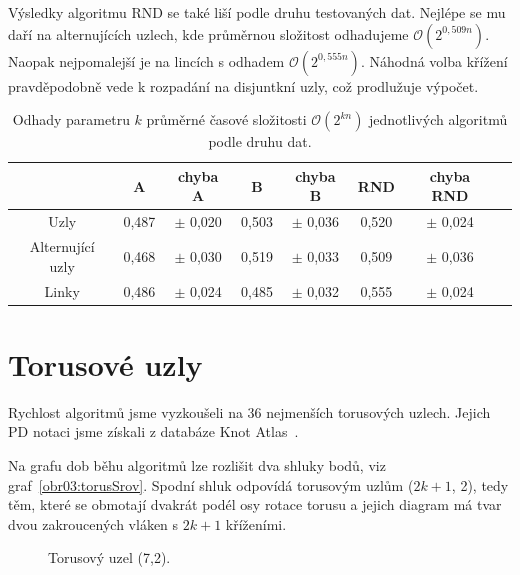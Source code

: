 Výsledky algoritmu RND se také liší podle druhu testovaných dat. Nejlépe se mu daří na alternujících uzlech, kde průměrnou složitost odhadujeme $\mathcal{O}(2^{0,509 n})$. Naopak nejpomalejší je na lincích s odhadem $\mathcal{O}(2^{0,555 n})$. Náhodná volba křížení pravděpodobně vede k rozpadání na disjuntkní uzly, což prodlužuje výpočet.

\begin{table}[t]
\centering
  \begin{tabular}{*{8}{c}}
    \toprule
       & A & chyba A & B & chyba B &  RND & chyba RND \\ 
    \midrule
    Uzly  & 0,487 & $\pm$ 0,020  &   0,503 & $\pm$ 0,036   &  0,520 & $\pm$ 0,024\\
    Alternující uzly & 0,468  & $\pm$ 0,030 &  0,519 & $\pm$  0,033 & 0,509 & $\pm$ 0,036\\
    Linky  & 0,486 &  $\pm$ 0,024 &   0,485 & $\pm$  0,032  &   0,555 & $\pm$ 0,024\\
    \bottomrule
  \end{tabular}
    \caption{Odhady parametru $k$ průměrné časové složitosti $\mathcal{O}(2^{kn})$ jednotlivých algoritmů podle druhu dat.} \label{datatab}

\end{table} 


\section{Torusové uzly} \label{torus}



Rychlost algoritmů jsme vyzkoušeli na 36 nejmenších torusových uzlech. Jejich PD notaci jsme získali z databáze Knot Atlas~\cite{knotatlas}.

Na grafu dob běhu algoritmů lze rozlišit dva shluky bodů, viz graf~\ref{obr03:torusSrov}. Spodní shluk odpovídá torusovým uzlům ($2k+1$, 2), tedy těm, které se obmotají dvakrát podél osy rotace torusu a jejich diagram má tvar dvou zakroucených vláken s $2k+1$ kříženími.

\begin{figure}[H]\centering
{}
\caption{Torusový uzel (7,2).}
\label{obr03:torus7}
\end{figure}

